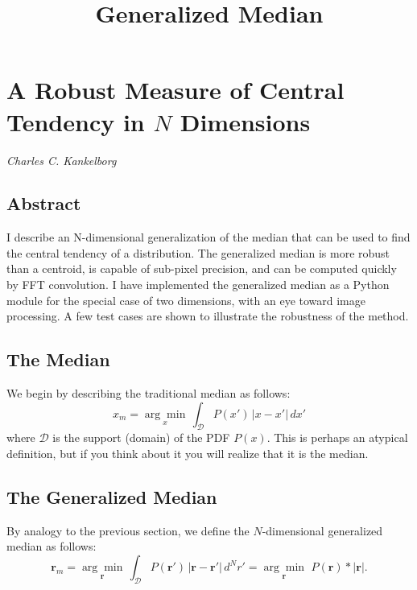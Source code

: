 \documentclass[11pt]{article}
\title{Generalized Median}
\begin{document}
    
    
    \maketitle
    
    

    
    \section{\texorpdfstring{A Robust Measure of Central Tendency in \(N\)
Dimensions}{A Robust Measure of Central Tendency in N Dimensions}}\label{a-robust-measure-of-central-tendency-in-n-dimensions}

\emph{Charles C. Kankelborg}

\subsection{Abstract}\label{abstract}

I describe an N-dimensional generalization of the median that can be
used to find the central tendency of a distribution. The generalized
median is more robust than a centroid, is capable of sub-pixel
precision, and can be computed quickly by FFT convolution. I have
implemented the generalized median as a Python module for the special
case of two dimensions, with an eye toward image processing. A few test
cases are shown to illustrate the robustness of the method.

    \subsection{The Median}\label{the-median}

We begin by describing the traditional median as follows: \[
    x_m = \underset{x}{\arg \min} \,
        \int_{\mathcal{D}}  P(x')\, \left| x-x' \right| \,dx'
\] where \(\mathcal{D}\) is the support (domain) of the PDF \(P(x)\).
This is perhaps an atypical definition, but if you think about it you
will realize that it is the median.

    \subsection{The Generalized Median}\label{the-generalized-median}

By analogy to the previous section, we define the \(N\)-dimensional
generalized median as follows: \[
    \mathbf{r}_m = \underset{\mathbf{r}}{\arg \min} \,
        \int_{\mathcal{D}} P(\mathbf{r'})\,\left| \mathbf{r-r'} \right| \,d^N r'
        = \underset{\mathbf{r}}{\arg \min} \,\,P(\mathbf{r}) * \left|\mathbf{r}\right|.
\]
\end{document}
